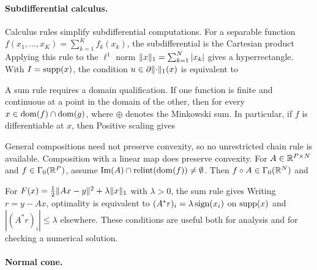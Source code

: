 \paragraph{Subdifferential calculus.}

Calculus rules simplify subdifferential computations. For a separable function $f(x_1,\ldots,x_K)=\sum_{k=1}^K f_k(x_k)$, the subdifferential is the Cartesian product
Applying this rule to the $\ell^1$ norm $\lVert x\rVert_1=\sum_{k=1}^N |x_k|$ gives
a hyperrectangle. With $I = \operatorname{supp}(x)$, the condition $u \in \partial \lVert\cdot\rVert_1(x)$ is equivalent to

A sum rule requires a domain qualification. If one function is finite and continuous at a point in the domain of the other, then for every $x\in\operatorname{dom}(f)\cap\operatorname{dom}(g)$,
where $\oplus$ denotes the Minkowski sum. In particular, if $f$ is differentiable at $x$, then
Positive scaling gives

General compositions need not preserve convexity, so no unrestricted chain rule is available.
%
Composition with a linear map does preserve convexity. For $A \in \mathbb{R}^{P \times N}$ and $f \in \Gamma_0(\mathbb{R}^P)$, assume $\operatorname{Im}(A)\cap\operatorname{relint}(\operatorname{dom}(f))\neq\emptyset$. Then $f \circ A \in \Gamma_0(\mathbb{R}^N)$ and

\begin{rem}
For $F(x)=\frac12\lVert Ax-y\rVert^2+\lambda\lVert x\rVert_1$ with $\lambda>0$, the sum rule gives
Writing $r=y-Ax$, optimality is equivalent to $(A^*r)_i=\lambda\operatorname{sign}(x_i)$ on $\operatorname{supp}(x)$ and $|(A^*r)_i|\leq\lambda$ elsewhere. These conditions are useful both for analysis and for checking a numerical solution.
\end{rem}

\paragraph{Normal cone.}


